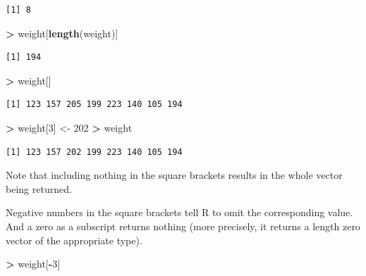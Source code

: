 \documentclass[
]{krantz}
\makeatletter
\newenvironment{Shaded}{\begin{snugshade}}{\end{snugshade}}
\newcommand{\DecValTok}[1]{\textcolor[rgb]{0.06,0.06,0.06}{#1}}
\newcommand{\KeywordTok}[1]{\textcolor[rgb]{0.27,0.27,0.27}{\textbf{#1}}}
\newcommand{\NormalTok}[1]{#1}
\newcommand{\OperatorTok}[1]{\textcolor[rgb]{0.43,0.43,0.43}{\textbf{#1}}}
\newcommand{\StringTok}[1]{\textcolor[rgb]{0.5,0.5,0.5}{#1}}
\newenvironment{kframe}{%
\medskip{}
\setlength{\fboxsep}{.8em}
 \def\at@end@of@kframe{}%
 \ifinner\ifhmode%
  \def\at@end@of@kframe{\end{minipage}}%
  \begin{minipage}{\columnwidth}%
 \fi\fi%
 \def\FrameCommand##1{\hskip\@totalleftmargin \hskip-\fboxsep
 \colorbox{shadecolor}{##1}\hskip-\fboxsep
     \hskip-\linewidth \hskip-\@totalleftmargin \hskip\columnwidth}%
 \MakeFramed {\advance\hsize-\width
   \@totalleftmargin\z@ \linewidth\hsize
   \@setminipage}}%
 {\par\unskip\endMakeFramed%
 \at@end@of@kframe}
\renewenvironment{Shaded}{\begin{kframe}}{\end{kframe}}
\makeatother
\begin{document}
\begin{verbatim}
[1] 8
\end{verbatim}

\begin{Shaded}
\begin{Highlighting}[]
\OperatorTok{\textgreater{}}\StringTok{ }\NormalTok{weight[}\KeywordTok{length}\NormalTok{(weight)]}
\end{Highlighting}
\end{Shaded}

\begin{verbatim}
[1] 194
\end{verbatim}

\begin{Shaded}
\begin{Highlighting}[]
\OperatorTok{\textgreater{}}\StringTok{ }\NormalTok{weight[]}
\end{Highlighting}
\end{Shaded}

\begin{verbatim}
[1] 123 157 205 199 223 140 105 194
\end{verbatim}

\begin{Shaded}
\begin{Highlighting}[]
\OperatorTok{\textgreater{}}\StringTok{ }\NormalTok{weight[}\DecValTok{3}\NormalTok{] \textless{}{-}}\StringTok{ }\DecValTok{202}
\OperatorTok{\textgreater{}}\StringTok{ }\NormalTok{weight}
\end{Highlighting}
\end{Shaded}

\begin{verbatim}
[1] 123 157 202 199 223 140 105 194
\end{verbatim}

Note that including nothing in the square brackets results in the whole vector being returned.

Negative numbers in the square brackets tell R to omit the corresponding value. And a zero as a subscript returns nothing (more precisely, it returns a length zero vector of the appropriate type).

\begin{Shaded}
\begin{Highlighting}[]
\OperatorTok{\textgreater{}}\StringTok{ }\NormalTok{weight[}\OperatorTok{{-}}\DecValTok{3}\NormalTok{]}
\end{Highlighting}
\end{Shaded}
\end{document}
